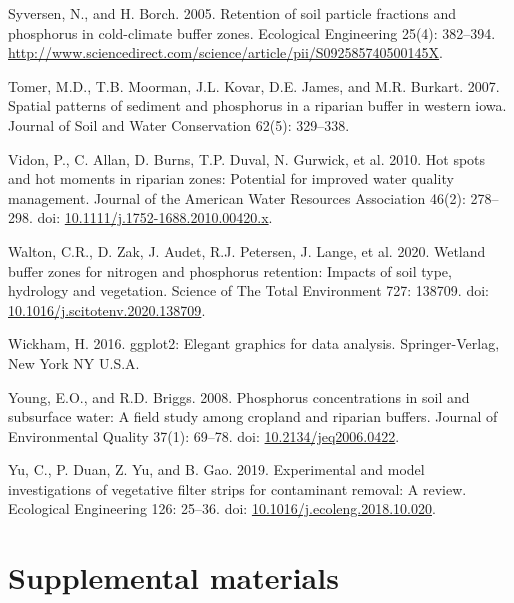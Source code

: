 \documentclass[
]{agujournal2019}
\newlength{\cslhangindent}
\newenvironment{CSLReferences}[2] %
 {\begin{list}{}{%
  \setlength{\itemindent}{0pt}
  \setlength{\leftmargin}{0pt}
  \setlength{\parsep}{0pt}
  \ifodd #1
   \setlength{\leftmargin}{\cslhangindent}
   \setlength{\itemindent}{-1\cslhangindent}
  \fi
  \setlength{\itemsep}{#2\baselineskip}}}
 {\end{list}}
\begin{document}
\begin{CSLReferences}{1}{1}
Syversen, N., and H. Borch. 2005. Retention of soil particle fractions
and phosphorus in cold-climate buffer zones. Ecological Engineering
25(4): 382--394.
\url{http://www.sciencedirect.com/science/article/pii/S092585740500145X}.

Tomer, M.D., T.B. Moorman, J.L. Kovar, D.E. James, and M.R. Burkart.
2007. Spatial patterns of sediment and phosphorus in a riparian buffer
in western iowa. Journal of Soil and Water Conservation 62(5): 329--338.

Vidon, P., C. Allan, D. Burns, T.P. Duval, N. Gurwick, et al. 2010. Hot
spots and hot moments in riparian zones: Potential for improved water
quality management. Journal of the American Water Resources Association
46(2): 278--298. doi:
\href{https://doi.org/10.1111/j.1752-1688.2010.00420.x}{10.1111/j.1752-1688.2010.00420.x}.

Walton, C.R., D. Zak, J. Audet, R.J. Petersen, J. Lange, et al. 2020.
Wetland buffer zones for nitrogen and phosphorus retention: Impacts of
soil type, hydrology and vegetation. Science of The Total Environment
727: 138709. doi:
\href{https://doi.org/10.1016/j.scitotenv.2020.138709}{10.1016/j.scitotenv.2020.138709}.

Wickham, H. 2016. ggplot2: Elegant graphics for data analysis.
Springer-Verlag, New York NY U.S.A.

Young, E.O., and R.D. Briggs. 2008. Phosphorus concentrations in soil
and subsurface water: A field study among cropland and riparian buffers.
Journal of Environmental Quality 37(1): 69--78. doi:
\href{https://doi.org/10.2134/jeq2006.0422}{10.2134/jeq2006.0422}.

Yu, C., P. Duan, Z. Yu, and B. Gao. 2019. Experimental and model
investigations of vegetative filter strips for contaminant removal: A
review. Ecological Engineering 126: 25--36. doi:
\href{https://doi.org/10.1016/j.ecoleng.2018.10.020}{10.1016/j.ecoleng.2018.10.020}.

\end{CSLReferences}

\section*{Supplemental materials}\label{supplemental-materials}
\end{document}
